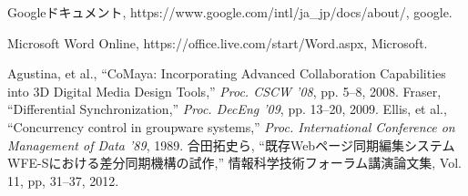\renewcommand{\bibname}{参考文献}
\begin{thebibliography}{}

Googleドキュメント, https://www.google.com/intl/ja_jp/docs/about/, google.

Microsoft Word Online, https://office.live.com/start/Word.aspx, Microsoft.

Agustina, et al., ``CoMaya: Incorporating Advanced Collaboration Capabilities into 3D Digital Media Design Tools,'' {\it Proc. CSCW '08}, pp. 5--8, 2008.
Fraser,	``Differential Synchronization,''  {\it Proc. DecEng '09}, pp. 13--20, 2009.
Ellis, et al., ``Concurrency control in groupware systems,'' {\it Proc. International Conference on Management of Data '89}, 1989.
合田拓史ら, ``既存Webページ同期編集システムWFE-Sにおける差分同期機構の試作,'' 情報科学技術フォーラム講演論文集, Vol. 11, pp, 31--37, 2012.
\end{thebibliography}
